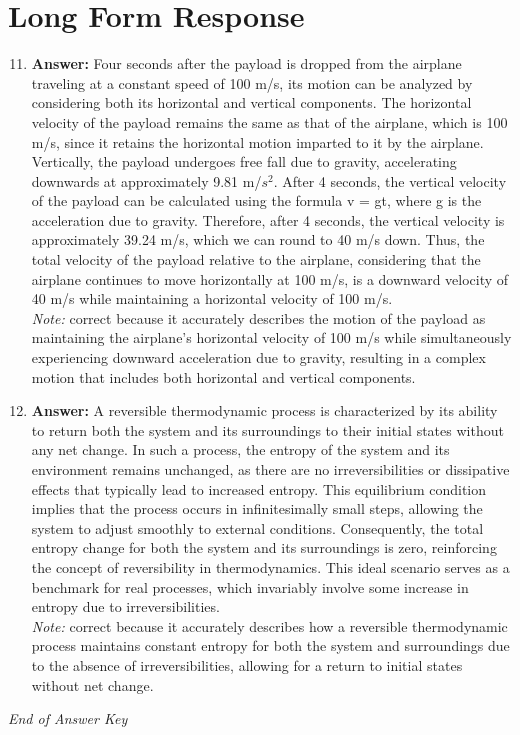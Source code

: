 \documentclass[12pt]{article}
\begin{document}
\section*{Long Form Response}
\begin{enumerate}[label=\arabic*.]
\setcounter{enumi}{10}
\item \textbf{Answer:} Four seconds after the payload is dropped from the airplane traveling at a constant speed of 100 m/s, its motion can be analyzed by considering both its horizontal and vertical components. The horizontal velocity of the payload remains the same as that of the airplane, which is 100 m/s, since it retains the horizontal motion imparted to it by the airplane. Vertically, the payload undergoes free fall due to gravity, accelerating downwards at approximately 9.81 m/$s^2$. After 4 seconds, the vertical velocity of the payload can be calculated using the formula v = gt, where g is the acceleration due to gravity. Therefore, after 4 seconds, the vertical velocity is approximately 39.24 m/s, which we can round to 40 m/s down. Thus, the total velocity of the payload relative to the airplane, considering that the airplane continues to move horizontally at 100 m/s, is a downward velocity of 40 m/s while maintaining a horizontal velocity of 100 m/s.
\\ \textit{Note:} correct because it accurately describes the motion of the payload as maintaining the airplane's horizontal velocity of 100 m/s while simultaneously experiencing downward acceleration due to gravity, resulting in a complex motion that includes both horizontal and vertical components.
\item \textbf{Answer:} A reversible thermodynamic process is characterized by its ability to return both the system and its surroundings to their initial states without any net change. In such a process, the entropy of the system and its environment remains unchanged, as there are no irreversibilities or dissipative effects that typically lead to increased entropy. This equilibrium condition implies that the process occurs in infinitesimally small steps, allowing the system to adjust smoothly to external conditions. Consequently, the total entropy change for both the system and its surroundings is zero, reinforcing the concept of reversibility in thermodynamics. This ideal scenario serves as a benchmark for real processes, which invariably involve some increase in entropy due to irreversibilities.
\\ \textit{Note:} correct because it accurately describes how a reversible thermodynamic process maintains constant entropy for both the system and surroundings due to the absence of irreversibilities, allowing for a return to initial states without net change.
\end{enumerate}

\vfill
\noindent\textit{End of Answer Key}
\end{document}

